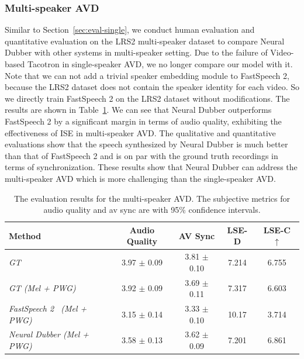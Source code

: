 \documentclass{article}
\begin{document}
\subsubsection{Multi-speaker AVD}
Similar to Section~\ref{sec:eval-single}, we conduct human evaluation and quantitative evaluation on the LRS2 multi-speaker dataset to compare Neural Dubber with other systems in multi-speaker setting. Due to the failure of Video-based Tacotron in single-speaker AVD, we no longer compare our model with it. Note that we can not add a trivial speaker embedding module to FastSpeech 2, because the LRS2 dataset does not contain the speaker identity for each video. So we directly train FastSpeech 2 on the LRS2 dataset without modifications. The results are shown in Table~\ref{tab:multi_svd}. We can see that Neural Dubber outperforms FastSpeech 2 by a significant margin in terms of audio quality, exhibiting the effectiveness of ISE in multi-speaker AVD. The qualitative and quantitative evaluations show that the speech synthesized by Neural Dubber is much better than that of FastSpeech 2 and is on par with the ground truth recordings in terms of synchronization. These results show that Neural Dubber can address the multi-speaker AVD which is more challenging than the single-speaker AVD.

\begin{table}[htbp]
	\centering
	\small
	\vspace{-0.0cm}
	\begin{tabular}{ l | c | c || c | c }
		\toprule
		\textbf{Method} &  \textbf{Audio Quality} & \textbf{AV Sync} & \textbf{LSE-D}  & \textbf{LSE-C} $\uparrow$\\ 
		\midrule
		\textit{GT} & 3.97 $\pm$ 0.09 & 3.81 $\pm$ 0.10 & 7.214 & 6.755 \\
	    \textit{GT (Mel + PWG)} & 3.92 $\pm$ 0.09 & 3.69 $\pm$ 0.11 & 7.317 & 6.603 \\
	    \midrule
	    \textit{FastSpeech 2~\cite{ren2021fastspeech} (Mel + PWG)} & 3.15 $\pm$ 0.14 & 3.33 $\pm$ 0.10 & 10.17 & 3.714 \\
		\midrule 
		\textit{Neural Dubber (Mel + PWG)} & 3.58 $\pm$ 0.13 & 3.62 $\pm$ 0.09 & 7.201 & 6.861 \\
		\bottomrule
	\end{tabular}
	\vspace{0.3cm}
	\caption{The evaluation results for the multi-speaker AVD. The subjective metrics for audio quality and av sync are with 95\% confidence intervals.}
	\label{tab:multi_svd}
	\vspace{-0.5cm}
\end{table}
\end{document}
